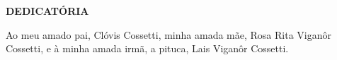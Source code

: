 \begin{center}
\textbf{DEDICATÓRIA}
\end{center}
\vspace{0.5cm}

Ao meu amado pai, Clóvis Cossetti, minha amada mãe, Rosa Rita Viganôr Cossetti, e à minha amada irmã, a pituca, Lais Viganôr Cossetti.
